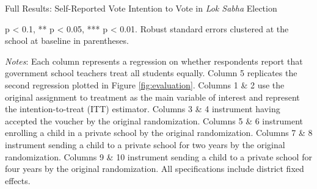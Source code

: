 \documentclass[hidelinks, 12pt, titlepage]{article}
\begin{document}
\begin{landscape}
				\clearpage

				\begin{table}
					\begin{threeparttable}
						\centering
						\caption{Full Results: Self-Reported Vote Intention to Vote in \emph{Lok Sabha} Election\label{table:appendixls}}
						
						\begin{tablenotes}
							\item * p < 0.1, ** p < 0.05, *** p < 0.01. Robust standard errors clustered at the school at baseline in parentheses.
							\item \emph{Notes}: Each column represents a regression on whether respondents report that government school teachers treat all students equally.  Column 5 replicates the second regression plotted in Figure \ref{fig:evaluation}.  Columns 1 \& 2 use the original assignment to treatment as the main variable of interest and represent the intention-to-treat (ITT) estimator.  Columns 3 \& 4 instrument having accepted the voucher by the original randomization.  Columns 5 \& 6 instrument enrolling a child in a private school by the original randomization.  Columns 7 \& 8 instrument sending a child to a private school for two years by the original randomization.  Columns 9 \& 10 instrument sending a child to a private school for four years by the original randomization.  All specifications include district fixed effects.
						\end{tablenotes}
					\end{threeparttable}
				\end{table}

			\end{landscape}
	
\end{document}
